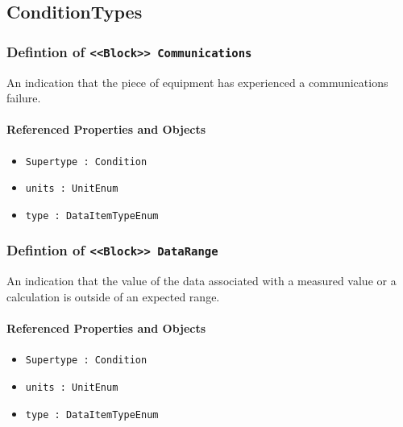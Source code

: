 \subsection{ConditionTypes} \label{model:ConditionTypes}
\subsubsection{Defintion of \texttt{<<Block>> Communications}}
  \label{type:Communications}

\FloatBarrier

An indication that the piece of equipment has experienced a communications failure.

\FloatBarrier
\paragraph{Referenced Properties and Objects}

\begin{itemize}
\item \texttt{Supertype : Condition}

\item \texttt{units : UnitEnum}

\item \texttt{type : DataItemTypeEnum}

\end{itemize}
\FloatBarrier
\subsubsection{Defintion of \texttt{<<Block>> DataRange}}
  \label{type:DataRange}

\FloatBarrier

An indication that the value of the data associated with a measured value or a calculation is outside of an expected range.

\FloatBarrier
\paragraph{Referenced Properties and Objects}

\begin{itemize}
\item \texttt{Supertype : Condition}

\item \texttt{units : UnitEnum}

\item \texttt{type : DataItemTypeEnum}

\end{itemize}
\FloatBarrier
